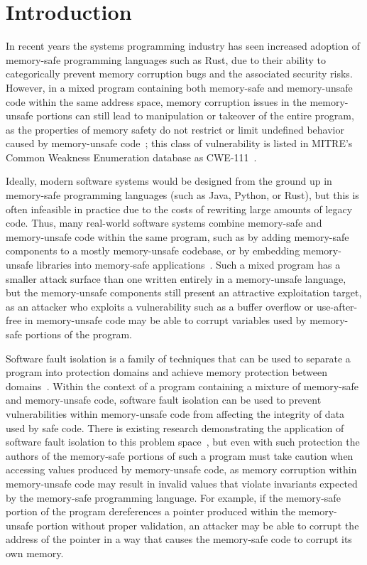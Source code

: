 \chapter{Introduction}

In recent years the systems programming industry has seen increased adoption of memory-safe
programming languages such as Rust, due to their ability to categorically prevent memory corruption
bugs and the associated security risks. However, in a mixed program containing both memory-safe and
memory-unsafe code within the same address space, memory corruption issues in the memory-unsafe
portions can still lead to manipulation or takeover of the entire program, as the properties of
memory safety do not restrict or limit undefined behavior caused by memory-unsafe
code~\cite{hu:crust, lolcads:e2va}; this class of vulnerability is listed in MITRE's Common Weakness
Enumeration database as CWE-111~\cite{mitre:cwe-111}.

Ideally, modern software systems would be designed from the ground up in memory-safe programming
languages (such as Java, Python, or Rust), but this is often infeasible in practice due to the costs
of rewriting large amounts of legacy code. Thus, many real-world software systems combine
memory-safe and memory-unsafe code within the same program, such as by adding memory-safe components
to a mostly memory-unsafe codebase, or by embedding memory-unsafe libraries into memory-safe
applications~\cite{rust:ffi, oracle:jni}. Such a mixed program has a smaller attack surface than one
written entirely in a memory-unsafe language, but the memory-unsafe components still present an
attractive exploitation target, as an attacker who exploits a vulnerability such as a buffer
overflow or use-after-free in memory-unsafe code may be able to corrupt variables used by
memory-safe portions of the program.

Software fault isolation is a family of techniques that can be used to separate a program into
protection domains and achieve memory protection between domains~\cite{wahbe:sfi}. Within the
context of a program containing a mixture of memory-safe and memory-unsafe code, software fault
isolation can be used to prevent vulnerabilities within memory-unsafe code from affecting the
integrity of data used by safe code. There is existing research demonstrating the application of
software fault isolation to this problem space~\cite{ghoshn:enclosure, kirth:pkru}, but even with
such protection the authors of the memory-safe portions of such a program must take caution when
accessing values produced by memory-unsafe code, as memory corruption within memory-unsafe code may
result in invalid values that violate invariants expected by the memory-safe programming language.
For example, if the memory-safe portion of the program dereferences a pointer produced within the
memory-unsafe portion without proper validation, an attacker may be able to corrupt the address of
the pointer in a way that causes the memory-safe code to corrupt its own memory.

